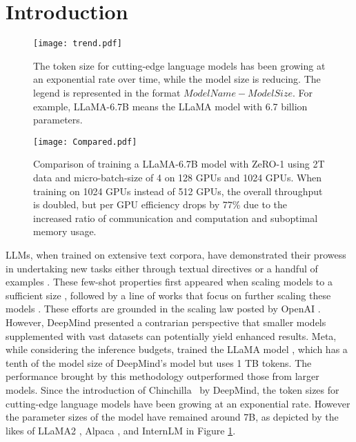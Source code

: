 \section{Introduction}
\label{sec_intro}
\begin{figure}[t]
    \centering
    \texttt{[image: trend.pdf]}
    \caption{The token size for cutting-edge language models has been growing at an exponential rate over time, while the model size is reducing. The legend is represented in the format $ModelName-ModelSize$. For example, LLaMA-6.7B means the LLaMA model with 6.7 billion parameters.}
    \label{trend}
\end{figure}

\begin{figure}[ht]
    \centering
    \texttt{[image: Compared.pdf]}
    \caption{Comparison of training a LLaMA-6.7B model with ZeRO-1 using 2T data and micro-batch-size of 4 on 128 GPUs and 1024 GPUs. When training on 1024 GPUs instead of 512 GPUs, the overall throughput is doubled, but per GPU efficiency drops by 77\% due to the increased ratio of communication and computation and suboptimal memory usage.}
    \label{compared}
\end{figure}





LLMs, when trained on extensive text corpora, have demonstrated their prowess in undertaking new tasks \cite{Newtask1,Newtask2,Newtask3} either through textual directives or a handful of examples \cite{GPT1}. 
These few-shot properties first appeared when scaling models to a sufficient size \cite{kapscaling}, followed by a line of works that focus on further scaling these models \cite{GPT1,GPT2,GPT3,OPT,GLM-130B}. These efforts are grounded in the scaling law posted by OpenAI \cite{kapscaling,openaiscalinglaw}. However, DeepMind \cite{trainingcomputeoptimal} presented a contrarian perspective that smaller models supplemented with vast datasets can potentially yield enhanced results. Meta, while considering the inference budgets, trained the LLaMA model \cite{LLaMA}, which has a tenth of the model size of DeepMind's model but uses 1 TB tokens. The performance brought by this methodology outperformed those from larger models. Since the introduction of Chinchilla~\cite{trainingcomputeoptimal} by DeepMind, the token sizes for cutting-edge language models have been growing at an exponential rate. However the parameter sizes of the model have remained around 7B, as depicted by the likes of LLaMA2 \cite{Llama2}, Alpaca \cite{Alpaca}, and InternLM \cite{InternLM} in Figure \ref{trend}. 

